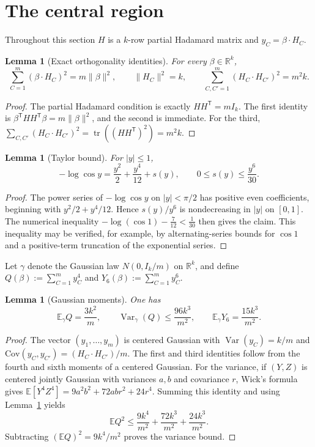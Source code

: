 \documentclass[11pt,reqno]{amsart}
\theoremstyle{plain}
\newtheorem{lemma}[theorem]{Lemma}
\theoremstyle{definition}
\theoremstyle{remark}
\newcommand{\R}{\mathbb R}
\DeclareMathOperator{\tr}{tr}
\DeclareMathOperator{\Var}{Var}
\begin{document}
\section{The central region}

Throughout this section \(H\) is a \(k\)-row partial Hadamard matrix and
\(y_C=\beta\cdot H_C\).

\begin{lemma}[Exact orthogonality identities]\label{lem:orth}
For every \(\beta\in\R^k\),
\[
  \sum_{C=1}^m(\beta\cdot H_C)^2=m\|\beta\|^2,\qquad
  \|H_C\|^2=k,\qquad
  \sum_{C,C'=1}^m(H_C\cdot H_{C'})^2=m^2k.
\]
\end{lemma}

\begin{proof}
The partial Hadamard condition is exactly \(HH^{\mathsf T}=mI_k\). The first
identity is \(\beta^{\mathsf T}HH^{\mathsf T}\beta=m\|\beta\|^2\), and the
second is immediate. For the third,
\(\sum_{C,C'}(H_C\cdot H_{C'})^2=\tr((HH^{\mathsf T})^2)=m^2k\).
\end{proof}

\begin{lemma}[Taylor bound]\label{lem:taylor}
For \(|y|\le1\),
\[
  -\log\cos y=\frac{y^2}2+\frac{y^4}{12}+s(y),\qquad
  0\le s(y)\le\frac{y^6}{30}.
\]
\end{lemma}

\begin{proof}
The power series of \(-\log\cos y\) on \(|y|<\pi/2\) has positive even
coefficients, beginning with \(y^2/2+y^4/12\). Hence \(s(y)/y^6\) is
nondecreasing in \(|y|\) on \([0,1]\). The numerical inequality
\(-\log(\cos1)-\tfrac7{12}<\tfrac1{30}\) then gives the claim. This inequality
may be verified, for example, by alternating-series bounds for \(\cos1\) and a
positive-term truncation of the exponential series.
\end{proof}

Let \(\gamma\) denote the Gaussian law \(N(0,I_k/m)\) on \(\R^k\), and define
\(Q(\beta):=\sum_{C=1}^my_C^4\) and \(Y_6(\beta):=\sum_{C=1}^my_C^6\).

\begin{lemma}[Gaussian moments]\label{lem:moments}
One has
\[
  \mathbb E_\gamma Q=\frac{3k^2}m,\qquad
  \Var_\gamma(Q)\le\frac{96k^3}{m^2},\qquad
  \mathbb E_\gamma Y_6=\frac{15k^3}{m^2}.
\]
\end{lemma}

\begin{proof}
The vector \((y_1,\dots,y_m)\) is centered Gaussian with
\(\Var(y_C)=k/m\) and \(\mathrm{Cov}(y_C,y_{C'})=(H_C\cdot H_{C'})/m\). The
first and third identities follow from the fourth and sixth moments of a
centered Gaussian. For the variance, if \((Y,Z)\) is centered jointly Gaussian
with variances \(a,b\) and covariance \(r\), Wick's formula gives
\(\mathbb E[Y^4Z^4]=9a^2b^2+72abr^2+24r^4\). Summing this identity and using
Lemma~\ref{lem:orth} yields
\[
  \mathbb EQ^2\le\frac{9k^4}{m^2}+\frac{72k^3}{m^2}+\frac{24k^3}{m^2}.
\]
Subtracting \((\mathbb EQ)^2=9k^4/m^2\) proves the variance bound.
\end{proof}
\end{document}
